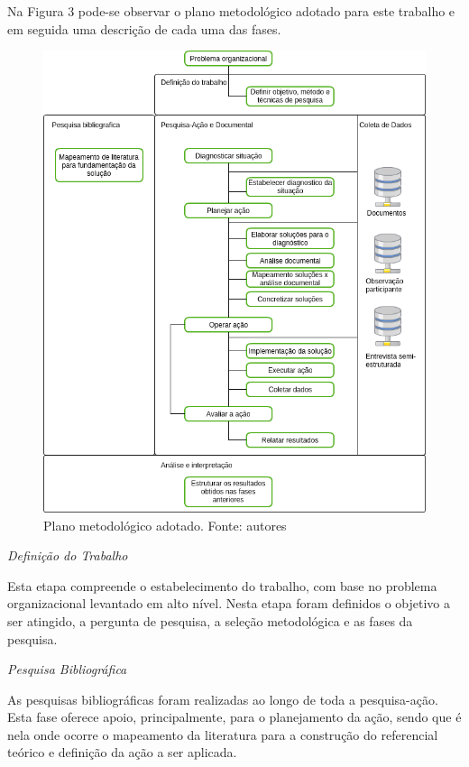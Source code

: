 Na Figura 3 pode-se observar o plano metodológico adotado para este trabalho e em seguida
uma descrição de cada uma das fases.

\begin{figure}[!htb]
	\centering
	\includegraphics[scale=0.6]{figuras/Plano_metodologico}
	\caption{Plano metodológico adotado. Fonte: autores}
\end{figure}

\newpage

\textit{Definição do Trabalho}

Esta etapa compreende o estabelecimento do trabalho, com base no problema
organizacional levantado em alto nível. Nesta etapa foram definidos o objetivo a ser atingido, a pergunta de pesquisa, a seleção metodológica e as fases da pesquisa.

\textit{Pesquisa Bibliográfica}

As pesquisas bibliográficas foram realizadas ao longo de toda a pesquisa-ação. Esta fase oferece apoio, principalmente, para o planejamento da ação, sendo que é nela onde ocorre o mapeamento da literatura para a construção do referencial teórico e definição da ação a ser aplicada.

